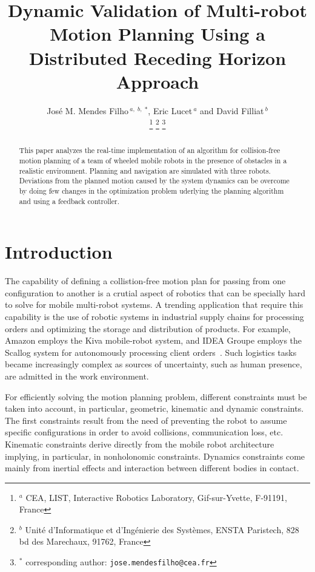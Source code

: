 \documentclass[letterpaper, 10 pt, conference]{ieeeconf}  %
\title{\LARGE \bf
Dynamic Validation of Multi-robot Motion Planning Using a Distributed Receding Horizon Approach
}
\author{Jos\'{e} M. Mendes Filho$\,^{a,}\,^{b,}\,^{*}$, Eric Lucet$\,^{a}$ and David Filliat$\,^{b}$\\%
\thanks{$^{a}$ CEA, LIST, Interactive Robotics Laboratory, Gif-sur-Yvette, F-91191, France}
\thanks{$^{b}$ Unit\'{e} d'Informatique et d'Ing\'{e}nierie des Syst\`{e}mes, ENSTA Paristech, 828 bd des Marechaux, 91762, France}
\thanks{$^{*}$ corresponding author: {\tt\small jose.mendesfilho@cea.fr}}
}
\begin{document}
\maketitle
\thispagestyle{empty}
\pagestyle{empty}


\begin{abstract}

This paper analyzes the real-time implementation of an algorithm for collision-free motion planning of a team of wheeled mobile robots in the presence of obstacles in a realistic enviromnent. Planning and navigation are simulated with three robots. Deviations from the planned motion caused by the system dynamics can be overcome by doing few changes in the optimization problem uderlying the planning algorithm and using a feedback controller.
\end{abstract}


\section{Introduction}


The capability of defining a collistion-free motion plan for passing from one configuration to another is a crutial aspect of robotics that can be specially hard to solve for mobile multi-robot systems. A trending application that require this capability is the use of robotic systems in industrial supply chains for processing orders and optimizing the storage and distribution of products. For example, Amazon employs the Kiva mobile-robot system, and IDEA Groupe employs the Scallog system for autonomously processing client orders~\cite{Gizmag,supplychain}. Such logistics tasks became increasingly complex as sources of uncertainty, such as human presence, are admitted in the work environment.


For efficiently solving the motion planning problem, different constraints must be taken into account, in particular, geometric, kinematic and dynamic constraints. The first constraints result from the need of preventing the robot to assume specific configurations in order to avoid collisions, communication loss, etc. Kinematic constraints derive directly from the mobile robot architecture implying, in particular, in nonholonomic constraints. Dynamics constraints come mainly from inertial effects and interaction between different bodies in contact.
\end{document}
